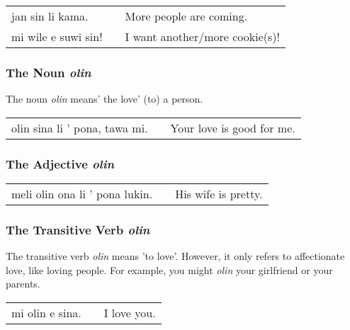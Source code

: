 \begin{supertabular}{p{5,5cm}|ll}
jan sin li kama. && More people are coming. \\
mi wile e suwi sin! && I want another/more cookie(s)! \\
\end{supertabular} 

%
\subsubsection*{The Noun \textit{olin}}
%
%
The noun \textit{olin} means' the love' (to) a person. 

\begin{supertabular}{p{5,5cm}|ll}
olin sina li ' pona, tawa mi. && Your love is good for me.  \\
\end{supertabular} 

%
\subsubsection*{The Adjective \textit{olin}}
%
%

\begin{supertabular}{p{5,5cm}|ll}
meli olin ona li ' pona lukin.  && His wife is pretty. \\
\end{supertabular} 

%
\subsubsection*{The Transitive Verb \textit{olin}}
%
%

The transitive verb \textit{olin} means 'to love'. 
However, it only refers to affectionate love, like loving people. 
For example, you might \textit{olin} your girlfriend or your parents.

\begin{supertabular}{p{5,5cm}|ll}
mi olin e sina. && I love you. \\
\end{supertabular}  
 
